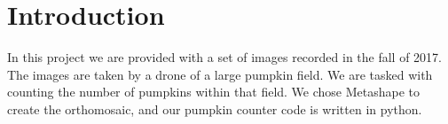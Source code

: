 
\section{Introduction}
In this project we are provided with a set of images recorded in the fall of 2017.
The images are taken by a drone of a large pumpkin field.
We are tasked with counting the number of pumpkins within that ﬁeld.
We chose Metashape to create the orthomosaic, and our pumpkin counter code is written in python.



